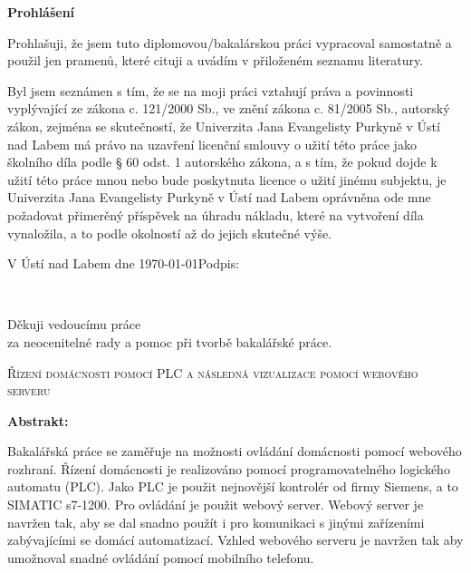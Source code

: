 \documentclass[a4paper,12pt,czech,bibliography=totoc]{scrbook}
\newcommand{\ZT}[1]{\colorbox{yellow}{\color{red}{#1}}}
\newcommand{\nazevcz}{{Řízení domácnosti pomocí PLC a následná vizualizace pomocí webového serveru}}        %
\begin{document}
\cleardoublepage

\thispagestyle{empty} 
{\bfseries Prohlášení} %

\vspace{0.5cm} %
Prohlašuji, že jsem tuto diplomovou/bakalárskou práci vypracoval
samostatně a použil
jen pramenů, které cituji a uvádím v přiloženém seznamu literatury.

\vspace{0.5em}

Byl jsem seznámen 
s tím, že se na moji práci vztahují práva a povinnosti vyplývající ze
zákona c. 121/2000 Sb., ve znění zákona c. 81/2005 Sb., autorský zákon, zejména se
skutečností, že Univerzita Jana Evangelisty Purkyně v Ústí nad Labem má právo na uzavření
licenční smlouvy o užití této práce jako školního díla podle § 60 odst. 1 autorského zákona, a
s tím, že pokud dojde k užití této práce mnou nebo bude poskytnuta licence o užití jinému
subjektu, je Univerzita Jana Evangelisty Purkyně v Ústí nad Labem oprávněna ode mne
požadovat přimerěný příspěvek na úhradu nákladu, které na vytvoření díla vynaložila, a to
podle okolností až do jejich skutečné výše.

\vspace{2em}

V Ústí nad Labem dne \today   \hfill Podpis: \makebox[3cm][s]{\dotfill}

\cleardoublepage
\thispagestyle{empty}
~
\vfill

\begin{flushright}
    Děkuji vedoucímu práce \ZT{doc. Pafnutijovi Snědldítětikaši, Ph.D.}\\ 
    za neocenitelné rady a pomoc při tvorbě bakalářské práce.
\end{flushright}

\cleardoublepage

\textsc{\nazevcz}

\textbf{Abstrakt:}

Bakalářská práce se zaměřuje na možnosti ovládání domácnosti pomocí webového rozhraní. Řízení domácnosti je realizováno pomocí programovatelného logického automatu (PLC). Jako PLC je použit nejnovější kontrolér od firmy Siemens, a to SIMATIC s7-1200. Pro ovládání je použit webový server. Webový server je navržen tak, aby se dal snadno použít i pro komunikaci s jinými zařízeními zabývajícími se domácí automatizací. Vzhled webového serveru je navržen tak aby umožnoval snadné ovládání pomocí mobilního telefonu.
\end{document}
